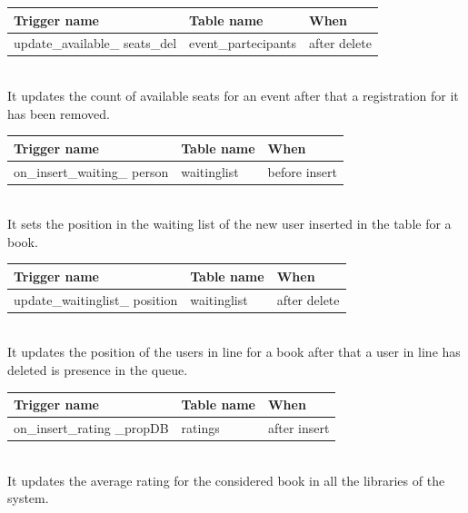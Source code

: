 \vspace{0.8cm}
\begin{tabular}[H]{p{4cm}|p{4cm}|p{4cm}}
	\textbf{Trigger name} & \textbf{Table name} & \textbf{When} \\
	\hline
	\rule{0pt}{4ex} update\_available\_
	seats\_del  & event\_partecipants & after delete \\
	\hline
\end{tabular}
\vspace{0.8cm}
\\
It updates the count of available seats for an event after that a registration for it has been removed.

\vspace{0.8cm}
\begin{tabular}[H]{p{4cm}|p{4cm}|p{4cm}}
	\textbf{Trigger name} & \textbf{Table name} & \textbf{When} \\
	\hline
	\rule{0pt}{4ex} on\_insert\_waiting\_
	person  & waitinglist & before insert \\
	\hline
\end{tabular}
\vspace{0.8cm}
\\
It sets the position in the waiting list of the new user inserted in the table for a book.

\vspace{0.8cm}
\begin{tabular}[H]{p{4cm}|p{4cm}|p{4cm}}
	\textbf{Trigger name} & \textbf{Table name} & \textbf{When} \\
	\hline
	\rule{0pt}{4ex} update\_waitinglist\_
	position  & waitinglist & after delete \\
	\hline
\end{tabular}
\vspace{0.8cm}
\\
It updates the position of the users in line for a book after that a user in line has deleted is presence in the queue.

\begin{tabular}[H]{p{4cm}|p{4cm}|p{4cm}}
	\textbf{Trigger name} & \textbf{Table name} & \textbf{When} \\
	\hline
	\rule{0pt}{4ex} on\_insert\_rating
	\_propDB  & ratings & after insert \\
	\hline
\end{tabular}
\vspace{0.4cm}
\\
It updates the average rating for the considered book in all the libraries of the system.
\vspace{0.4cm}




